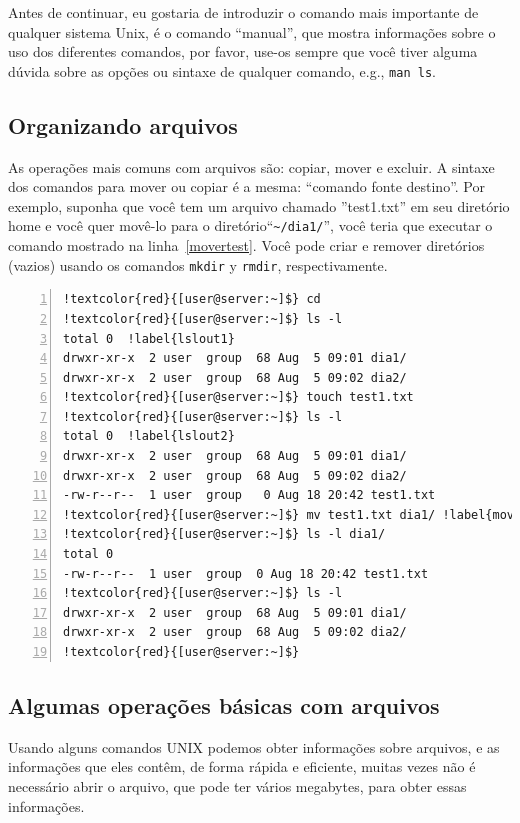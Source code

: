 \documentclass[letter,11pt]{book}
\begin{document}
Antes de continuar, eu gostaria de introduzir o comando mais importante de qualquer sistema Unix, é o comando ``manual'', que mostra informações sobre o uso dos diferentes comandos, por favor, use-os sempre que você tiver alguma dúvida sobre as opções ou sintaxe de qualquer comando, e.g., \Verb+man ls+.

\subsection{Organizando arquivos}

As operações mais comuns com arquivos são: copiar, mover e excluir. A sintaxe dos comandos para mover ou copiar é a mesma: ``comando fonte destino''. Por exemplo, suponha que você tem um arquivo chamado ''test1.txt'' em seu diretório home e você quer movê-lo para o diretório``\Verb+~/dia1/+'', você teria que executar o comando mostrado na linha~\ref{movertest}. Você pode criar e remover diretórios (vazios) usando os comandos \Verb+mkdir+ y \Verb+rmdir+, respectivamente.

\begin{Verbatim}[commandchars=!\{\},numbers=left,firstnumber=last,label=Organizando aquivos e direitorios,frame=topline,fontsize=\scriptsize]
!textcolor{red}{[user@server:~]$} cd
!textcolor{red}{[user@server:~]$} ls -l
total 0  !label{lslout1}
drwxr-xr-x  2 user  group  68 Aug  5 09:01 dia1/
drwxr-xr-x  2 user  group  68 Aug  5 09:02 dia2/
!textcolor{red}{[user@server:~]$} touch test1.txt
!textcolor{red}{[user@server:~]$} ls -l
total 0  !label{lslout2}
drwxr-xr-x  2 user  group  68 Aug  5 09:01 dia1/
drwxr-xr-x  2 user  group  68 Aug  5 09:02 dia2/
-rw-r--r--  1 user  group   0 Aug 18 20:42 test1.txt
!textcolor{red}{[user@server:~]$} mv test1.txt dia1/ !label{movertest}
!textcolor{red}{[user@server:~]$} ls -l dia1/
total 0
-rw-r--r--  1 user  group  0 Aug 18 20:42 test1.txt
!textcolor{red}{[user@server:~]$} ls -l
drwxr-xr-x  2 user  group  68 Aug  5 09:01 dia1/
drwxr-xr-x  2 user  group  68 Aug  5 09:02 dia2/
!textcolor{red}{[user@server:~]$}
\end{Verbatim} 

\subsection{Algumas operações básicas com arquivos}
Usando alguns comandos UNIX podemos obter informações sobre arquivos, e as informações que eles contêm, de forma rápida e eficiente, muitas vezes não é necessário abrir o arquivo, que pode ter vários megabytes, para obter essas informações.
\end{document}

